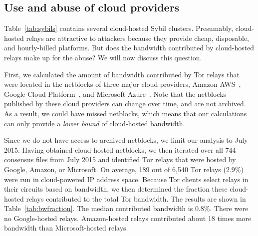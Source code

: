 

\subsection{Use and abuse of cloud providers}
Table~\ref{tab:sybils} contains several cloud-hosted Sybil clusters.
Presumably, cloud-hosted relays are attractive to attackers because they
provide cheap, disposable, and hourly-billed platforms.  But does the bandwidth
contributed by cloud-hosted relays make up for the abuse?  We will now discuss
this question.

First, we calculated the amount of bandwidth contributed by Tor relays that
were located in the netblocks of three major cloud providers, Amazon
AWS~\cite{amazonaws}, Google Cloud Platform~\cite{googlecloud}, and Microsoft
Azure~\cite{azure}.  Note that the netblocks published by these cloud providers
can change over time, and are not archived.  As a result, we could have missed
netblocks, which means that our calculations can only provide a \emph{lower
bound} of cloud-hosted bandwidth.

Since we do not have access to archived netblocks, we limit our analysis to
July 2015.  Having obtained cloud-hosted netblocks, we then iterated over all
744 consensus files from July 2015 and identified Tor relays that were hosted
by Google, Amazon, or Microsoft.  On average, 189 out of 6,540 Tor relays
(2.9\%) were run in cloud-powered IP address space.  Because Tor
clients select relays in their circuits based on bandwidth, we then determined
the fraction these cloud-hosted relays contributed to the total Tor bandwidth.
The results are shown in Table~\ref{tab:bwfraction}.  The median contributed
bandwidth is 0.8\%.  There were no Google-hosted relays.  Amazon-hosted relays
contributed about 18 times more bandwidth than Microsoft-hosted relays.


